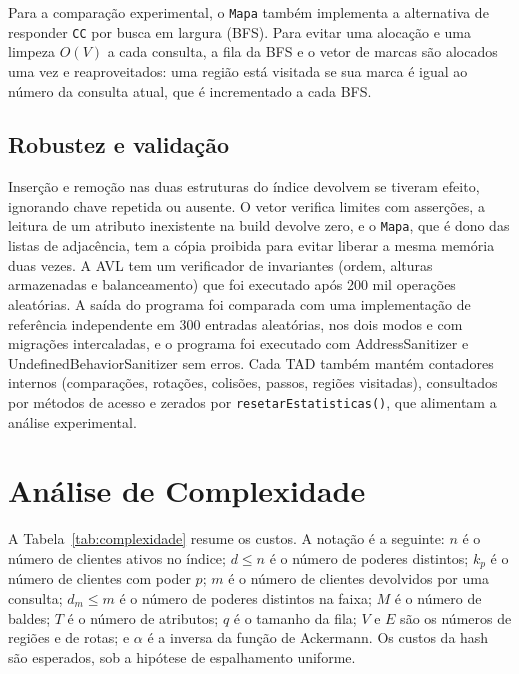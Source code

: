 \documentclass[letterpaper]{article} %
\begin{document}
Para a compara\c{c}\~ao experimental, o \texttt{Mapa} tamb\'em implementa a alternativa de responder \texttt{CC} por busca em largura (BFS). Para evitar uma aloca\c{c}\~ao e uma limpeza $O(V)$ a cada consulta, a fila da BFS e o vetor de marcas s\~ao alocados uma vez e reaproveitados: uma regi\~ao est\'a visitada se sua marca \'e igual ao n\'umero da consulta atual, que \'e incrementado a cada BFS.

\subsection{Robustez e valida\c{c}\~ao}

Inser\c{c}\~ao e remo\c{c}\~ao nas duas estruturas do \'indice devolvem se tiveram efeito, ignorando chave repetida ou ausente. O vetor verifica limites com asser\c{c}\~oes, a leitura de um atributo inexistente na build devolve zero, e o \texttt{Mapa}, que \'e dono das listas de adjac\^encia, tem a c\'opia proibida para evitar liberar a mesma mem\'oria duas vezes. A AVL tem um verificador de invariantes (ordem, alturas armazenadas e balanceamento) que foi executado ap\'os 200 mil opera\c{c}\~oes aleat\'orias. A sa\'ida do programa foi comparada com uma implementa\c{c}\~ao de refer\^encia independente em 300 entradas aleat\'orias, nos dois modos e com migra\c{c}\~oes intercaladas, e o programa foi executado com AddressSanitizer e UndefinedBehaviorSanitizer sem erros. Cada TAD tamb\'em mant\'em contadores internos (compara\c{c}\~oes, rota\c{c}\~oes, colis\~oes, passos, regi\~oes visitadas), consultados por m\'etodos de acesso e zerados por \texttt{resetarEstatisticas()}, que alimentam a an\'alise experimental.

\section{An\'alise de Complexidade}

A Tabela~\ref{tab:complexidade} resume os custos. A nota\c{c}\~ao \'e a seguinte: $n$ \'e o n\'umero de clientes ativos no \'indice; $d \le n$ \'e o n\'umero de poderes distintos; $k_p$ \'e o n\'umero de clientes com poder $p$; $m$ \'e o n\'umero de clientes devolvidos por uma consulta; $d_m \le m$ \'e o n\'umero de poderes distintos na faixa; $M$ \'e o n\'umero de baldes; $T$ \'e o n\'umero de atributos; $q$ \'e o tamanho da fila; $V$ e $E$ s\~ao os n\'umeros de regi\~oes e de rotas; e $\alpha$ \'e a inversa da fun\c{c}\~ao de Ackermann. Os custos da hash s\~ao esperados, sob a hip\'otese de espalhamento uniforme.
\end{document}
